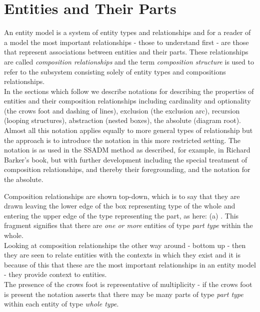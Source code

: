 

\section{Entities and Their Parts}
\noindent An entity model is a system of entity types and relationships and for a reader 
of a model the most 
important relationships - those to understand first - are those that represent associations between entities 
and their parts. These relationships are called 
\textit{composition relationships} and the term \textit{composition structure} is used to refer to the subsystem 
consisting solely of entity types and compositions relationships. \\

\noindent In the sections which follow we describe notations for describing the properties of
entities and their composition relationships including cardinality and optionality (the crows foot and dashing of lines), 
exclusion (the exclusion arc), recursion (looping structures), abstraction (nested boxes), the absolute (diagram root). 
Almost all this notation applies equally to more general types of relationship but the approach is to introduce the 
notation in this more restricted setting. The notation is as used in the SSADM method as described, 
for example, in Richard Barker's book, but with further development including the special treatment of composition relationships, and thereby their foregrounding, 
and the notation for the absolute.    

\vspace{0.2cm}
\noindent Composition relationships are shown top-down, which is to say that they are drawn leaving the lower edge of the box representing type of the whole and entering the upper edge of the type representing the part, as here: (a)
. This fragment signifies that there are \textit{one or more} entities of type \textit{part type} within the whole. \\

\noindent Looking at composition relationships the other way around - bottom up - then they are seen to relate entities with the contexts in which they exist
and it is because of this that these are the most important relationships in an entity model - they provide context to entities. \\

\noindent The presence of the crows foot is representative of multiplicity - if the crows foot is present the notation asserts that there may be many parts of type \textit{part type} within each entity of type \textit{whole type}.\\

